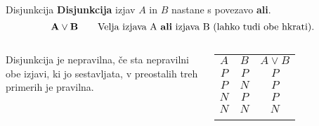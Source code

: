         \begin{frame}
            \begin{alertblock}{Disjunkcija}
                \textbf{Disjunkcija} izjav $A$ in $B$ nastane s povezavo \textbf{ali}.
                $$ \mathbf{A\lor B} \quad \quad \textmd{Velja izjava A \textbf{ali} izjava B 
                (lahko tudi obe hkrati).}$$
            \end{alertblock}
            \begin{columns}
                    \begin{alertblock}{}
                        Disjunkcija je nepravilna, če sta nepravilni obe izjavi, ki jo sestavljata,
                        v preostalih treh primerih je pravilna.
                    \end{alertblock}

                    \begin{table}
                        \centering
                        \begin{tabular}{||c|c|c||} 
                        \hhline{|t:===:t|}
                        \rowcolor[rgb]{0.843,0.718,0.718} $A$ & $B$ & $A\lor B$  \\ 
                        \hhline{|:===:|}
                        $P$ & $P$ & $P$                         \\ 
                        \hline
                        $P$ & $N$ & $P$                         \\ 
                        \hline
                        $N$ & $P$ & $P$                         \\ 
                        \hline
                        $N$ & $N$ & $N$                         \\
                        \hhline{|b:===:b|}
                        \end{tabular}
                    \end{table}

            \end{columns}


        \end{frame}

